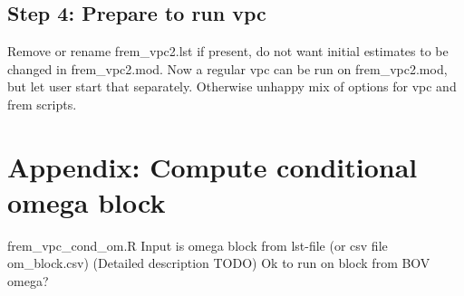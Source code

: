 \subsection{Step 4: Prepare to run  vpc}
Remove or rename frem\_vpc2.lst if present, do not want initial estimates to be changed in frem\_vpc2.mod.
Now a regular vpc can be run on frem\_vpc2.mod, but let user start that separately. Otherwise unhappy mix of options for vpc and frem scripts.

\section{Appendix: Compute conditional omega block}
frem\_vpc\_cond\_om.R
Input is omega block from lst-file (or csv file om\_block.csv) 
(Detailed description TODO)
Ok to run on block from BOV omega?




